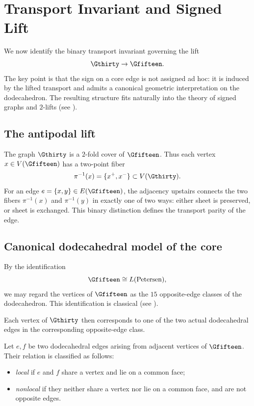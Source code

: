 \section{Transport Invariant and Signed Lift}

We now identify the binary transport invariant governing the lift
\[
\Gthirty \to \Gfifteen.
\]
The key point is that the sign on a core edge is not assigned ad hoc:
it is induced by the lifted transport and admits a canonical
geometric interpretation on the dodecahedron. The resulting structure
fits naturally into the theory of signed graphs and $2$-lifts
(see \cite{zaslavsky}).

\subsection{The antipodal lift}

The graph $\Gthirty$ is a $2$-fold cover of $\Gfifteen$. Thus each vertex
$x \in V(\Gfifteen)$ has a two-point fiber
\[
\pi^{-1}(x)=\{x^+,x^-\}\subset V(\Gthirty).
\]
For an edge $e=\{x,y\}\in E(\Gfifteen)$, the adjacency upstairs connects the
two fibers $\pi^{-1}(x)$ and $\pi^{-1}(y)$ in exactly one of two ways:
either sheet is preserved, or sheet is exchanged. This binary distinction
defines the transport parity of the edge.

\subsection{Canonical dodecahedral model of the core}

By the identification
\[
\Gfifteen \cong L(\mathrm{Petersen}),
\]
we may regard the vertices of $\Gfifteen$ as the $15$ opposite-edge classes
of the dodecahedron. This identification is classical (see
\cite{godsil_royle}).

Each vertex of $\Gthirty$ then corresponds to one of
the two actual dodecahedral edges in the corresponding opposite-edge class.

Let $e,f$ be two dodecahedral edges arising from adjacent vertices of
$\Gfifteen$. Their relation is classified as follows:

\begin{itemize}
\item \emph{local} if $e$ and $f$ share a vertex and lie on a common face;
\item \emph{nonlocal} if they neither share a vertex nor lie on a common face,
and are not opposite edges.
\end{itemize}

